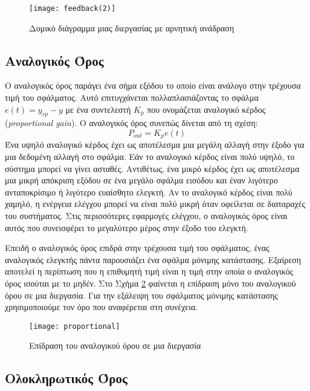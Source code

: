 \begin{figure}[h]
  \centering
  \texttt{[image: feedback(2)]}
  \caption{Δομικό διάγραμμα μιας διεργασίας με αρνητική ανάδραση}
  \label{fig:feedback(2)}
\end{figure}

\subsection{Αναλογικός Όρος} \label{subsec:proportional_control}

Ο αναλογικός όρος παράγει ένα σήμα εξόδου το οποίο είναι ανάλογο στην τρέχουσα τιμή του σφάλματος. Αυτό επιτυγχάνεται πολλαπλασιάζοντας το σφάλμα $e(t)=y_{sp} - y$ με ένα συντελεστή $K_p$ που ονομάζεται αναλογικό κέρδος (\emph{proportional gain}). Ο αναλογικός όρος συνεπώς δίνεται από τη σχέση:
\begin{equation}
P_{out}=K_p e(t)
\label{eq:p_out}
\end{equation}
Ένα υψηλό αναλογικό κέρδος έχει ως αποτέλεσμα μια μεγάλη αλλαγή στην έξοδο για μια δεδομένη αλλαγή στο σφάλμα. Εάν το αναλογικό κέρδος είναι πολύ υψηλό, το σύστημα μπορεί να γίνει ασταθές. Αντιθέτως, ένα μικρό κέρδος έχει ως αποτέλεσμα μια μικρή απόκριση εξόδου σε ένα μεγάλο σφάλμα εισόδου και έναν λιγότερο ανταποκρίσιμο ή λιγότερο ευαίσθητο ελεγκτή. Αν το αναλογικό κέρδος είναι πολύ χαμηλό, η ενέργεια ελέγχου μπορεί να είναι πολύ μικρή όταν οφείλεται σε διαταραχές του συστήματος. Στις περισσότερες εφαρμογές ελέγχου, ο αναλογικός όρος είναι αυτός που συνεισφέρει το μεγαλύτερο μέρος στην έξοδο του ελεγκτή.

Επειδή ο αναλογικός όρος επιδρά στην τρέχουσα τιμή του σφάλματος, ένας αναλογικός ελεγκτής πάντα παρουσιάζει ένα σφάλμα μόνιμης κατάστασης. Εξαίρεση αποτελεί η περίπτωση που η επιθυμητή τιμή είναι η τιμή στην οποία ο αναλογικός όρος ισούται με το μηδέν. Στο Σχήμα \ref{fig:proportional} φαίνεται η επίδραση μόνο του αναλογικού όρου σε μια διεργασία. Για την εξάλειψη του σφάλματος μόνιμης κατάστασης χρησιμοποιούμε τον όρο που αναφέρεται στη συνέχεια.

\begin{figure}[h]
  \centering
  \texttt{[image: proportional]}
  \caption{Επίδραση του αναλογικού όρου σε μια διεργασία}
  \label{fig:proportional}
\end{figure}

\subsection{Ολοκληρωτικός Όρος}

